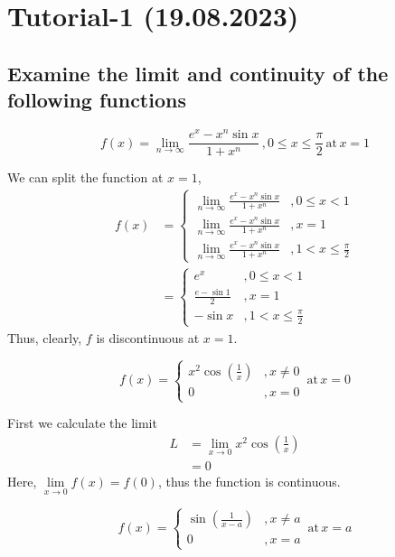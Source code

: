 \section{Tutorial-1 (19.08.2023)}
\subsection{Examine the limit and continuity of the following functions}
\begin{asign}
	\[f(x)=\lim\limits_{n\to\infty}\frac{e^x-x^n\sin x}{1+x^n} \, , 0\leq x\leq\frac{\pi}{2}\, \text{at} \, x=1\]
\end{asign}
\begin{anse}
	We can split the function at $x=1$,
	\[\begin{split}
		f(x)&=\begin{cases}
			\lim\limits_{n\to\infty}\frac{e^x-x^n\sin x}{1+x^n} &, 0\leq x < 1\\
			\lim\limits_{n\to\infty}\frac{e^x-x^n\sin x}{1+x^n} &, x=1\\
			\lim\limits_{n\to\infty}\frac{e^x-x^n\sin x}{1+x^n} &, 1<x\leq \frac{\pi}{2}
		\end{cases}\\
		&=\begin{cases}
			e^x &,  0\leq x < 1\\
			\frac{e-\sin 1}{2} &, x=1\\
			-\sin x &, 1<x\leq \frac{\pi}{2}
		\end{cases}
	\end{split}\]
	Thus, clearly, $f$ is discontinuous at $x=1$.
\end{anse}
\begin{asign}
	\[f(x)=\begin{cases}
		x^2\cos(\frac{1}{x}) &, x\neq0\\
		0 &, x=0
	\end{cases} \, \text{at} \, x=0 \]
\end{asign}
\begin{anse}
	First we calculate the limit
	\[\begin{split}
		L&=\lim\limits_{x\to 0}x^2\cos(\frac{1}{x})\\
		&=0
	\end{split}\]
	Here, $\lim\limits_{x\to0}f(x)=f(0)$, thus the function is continuous.
\end{anse}
\begin{asign}
	\[f(x)=\begin{cases}
		\sin(\frac{1}{x-a}) &, x\neq a\\
		0 &, x=a
	\end{cases} \, \text{at} \, x=a\]
\end{asign}
